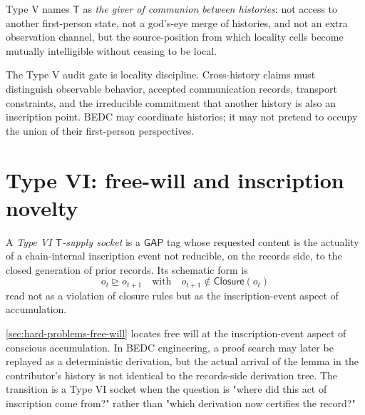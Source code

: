 \begin{definition}
\label{def:transcendental-supply-type-V-reading}
Type V names $\mathsf{T}$ as \emph{the giver of communion between histories}: not access to another first-person state, not a god's-eye merge of histories, and not an extra observation channel, but the source-position from which locality cells become mutually intelligible without ceasing to be local.
\end{definition}

\begin{remark}
\label{rem:transcendental-supply-type-V-gate}
The Type V audit gate is locality discipline. Cross-history claims must distinguish observable behavior, accepted communication records, transport constraints, and the irreducible commitment that another history is also an inscription point. BEDC may coordinate histories; it may not pretend to occupy the union of their first-person perspectives.
\end{remark}

\section{Type VI: free-will and inscription novelty}
\label{sec:transcendental-supply-type-VI}

\begin{definition}
\label{def:transcendental-supply-type-VI}
A \emph{Type VI $\mathsf{T}$-supply socket} is a $\mathsf{GAP}$ tag whose requested content is the actuality of a chain-internal inscription event not reducible, on the records side, to the closed generation of prior records. Its schematic form is
$$
o_t\trianglerighteq o_{t+1}
\quad\text{with}\quad
o_{t+1}\notin \mathsf{Closure}(o_t)
$$
read not as a violation of closure rules but as the inscription-event aspect of accumulation.
\end{definition}

\begin{example}
\label{ex:transcendental-supply-type-VI-engineering}
\autoref{sec:hard-problems-free-will} locates free will at the inscription-event aspect of conscious accumulation. In BEDC engineering, a proof search may later be replayed as a deterministic derivation, but the actual arrival of the lemma in the contributor's history is not identical to the records-side derivation tree. The transition is a Type VI socket when the question is "where did this act of inscription come from?" rather than "which derivation now certifies the record?"
\end{example}

